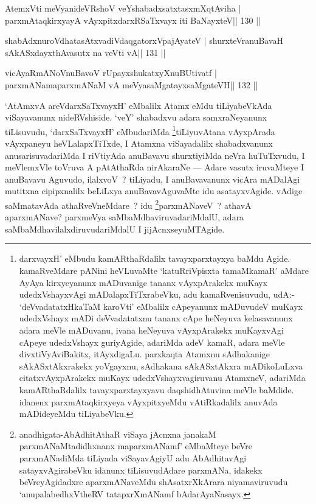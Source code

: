 \begin{shl}
AtemxVti meVyanideVRshoV veYshabadxsatxtasxmXqtAviha |
parxmAtaqkirxyayA vAyxpitxdarxRSaTxvayx iti BaNayxteV\hfill || 130 ||
\end{shl}

\begin{shl}
shabAdxnuroVdhatasAtxvadiVdaqgatorxVpajAyateV |
shurxteVranuBavaH sAkASxdayxthAvasutx na veVti vA\hfill || 131 ||
\end{shl}

\begin{shl}
vicAyaRmANoV\s nuBavoV rUpayxshukatxyXnuBUtivatf |
parxmANamaparxmANaM vA meVyasaMgatayxsaMgateVH\hfill || 132 ||
\end{shl}

\begin{artha}
`AtAmxvA areVdarxSaTxvayxH' eMbalilx Atamx eMdu tiLiyabeVkAda viSayavanunx nideRVshiside. `veY' shabadxvu adara samxraNeyanunx tiLisuvudu, `darxSaTxvayxH' eMbudariMda \footnote[4]{darxvayxH' eMbudu kamARthaRdalilx tavayxparxtayxya baMdu Agide. kamaRveMdare pANini heVLuvaMte `katuRriVpisxta tamaMkamaR' aMdare AyAya kirxyeyanunx mADuvanige tananx vAyxpArakekx muKayx udedxVshayxvAgi mADalapxTiTxrabeVku, adu kamaRvenisuvudu, udA:- `deVvadatatxHkaTaM karoVti' eMbalilx cApeyanunx mADuvudeV muKayx udedxVshayx mADi deVvadatatxnu tananx cApe heNeyuva kelasavanunx adara meVle mADuvanu, ivana heNeyuva vAyxpArakekx muKayxvAgi cApeye udedxVshayx guriyAgide, adariMda adeV kamaR, adara meVle divxtiVyAviBakitx, itAyxdigaLu. parxkaqta Atamxnu sAdhakanige sAkASxtAkxrakekx yoVgayxnu, sAdhakana sAkASxtAkxra mADikoLuLxva citatxvAyxpArakekx muKayx udedxVshayxvagiruvanu AtamxneV, adariMda kamARthaRdalilx tavayxparxtayxyavu daqshidhAtuvina meVle baMdide. idanenx parxmAtaqkirxyeya vAyxpitxyeMdu vAtiRkadalilx anuvAda mADideyeMdu tiLiyabeVku.}tiLiyuvAtana vAyxpArada vAyxpaneyu heVLalapxTiTxde, I Atamxna viSayadalilx shabadxvanunx anusarisuvadariMda I riVtiyAda anuBavavu shurxtiyiMda neVra huTuTxvudu, I meVlemxVle toVruva A pAtAthaRda nirAkaraNe  {\rm ---}  Adare vasutx iruvaMteye I anuBavavu Aguvudo, ilalxvoV~? tiLiyadu, I anuBavavanunx vicAra mADalAgi mutitxna cipipxnalilx beLiLxya anuBavavAguvaMte idu asatayxvAgide. vAdige saMmatavAda athaRveVneMdare~? idu \footnote[5]{anadhigata-AbAdhitAthaR viSaya jAcnxna janakaM parxmANaMtadidhxnanx maparxmANamf' eMbaMteye beVre parxmANadiMda tiLiyada viSayavAgiyU adu AbAdhitavAgi satayxvAgirabeVku idanunx tiLisuvudAdare parxmANa, idakekx beVreyAgidadxre aparxmANaveMdu shAsatxrXkArara niyamaviruvudu `anupalabedhxV\s theRV tatapxrXmANamf bAdarAyaNasayx.}parxmANaveV~? athavA aparxmANave?  parxmeVya saMbaMdhaviruvadariMdalU, adara saMbaMdhavilalxdiruvudariMdalU I jijAcnxseyuMTAgide.
\end{artha}

